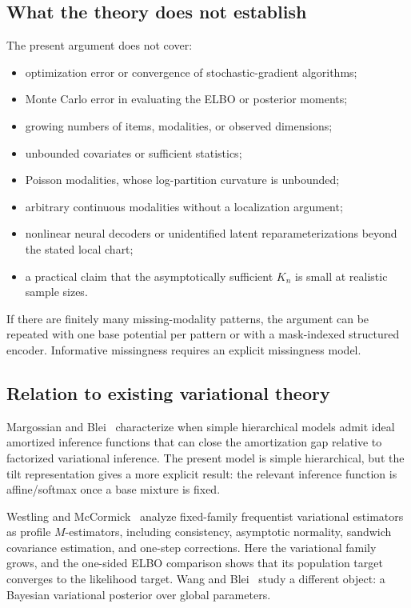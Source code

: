 \documentclass[11pt]{article}
\theoremstyle{definition}
\begin{document}
\subsection{What the theory does not establish}

The present argument does not cover:
\begin{itemize}
\item optimization error or convergence of stochastic-gradient algorithms;
\item Monte Carlo error in evaluating the ELBO or posterior moments;
\item growing numbers of items, modalities, or observed dimensions;
\item unbounded covariates or sufficient statistics;
\item Poisson modalities, whose log-partition curvature is unbounded;
\item arbitrary continuous modalities without a localization argument;
\item nonlinear neural decoders or unidentified latent reparameterizations beyond the stated local chart;
\item a practical claim that the asymptotically sufficient $K_n$ is small at realistic sample sizes.
\end{itemize}

If there are finitely many missing-modality patterns, the argument can be repeated with one base potential per pattern or with a mask-indexed structured encoder. Informative missingness requires an explicit missingness model.

\subsection{Relation to existing variational theory}

Margossian and Blei~\cite{margossianblei2024} characterize when simple hierarchical models admit ideal amortized inference functions that can close the amortization gap relative to factorized variational inference. The present model is simple hierarchical, but the tilt representation gives a more explicit result: the relevant inference function is affine/softmax once a base mixture is fixed.

Westling and McCormick~\cite{westling2019} analyze fixed-family frequentist variational estimators as profile $M$-estimators, including consistency, asymptotic normality, sandwich covariance estimation, and one-step corrections. Here the variational family grows, and the one-sided ELBO comparison shows that its population target converges to the likelihood target. Wang and Blei~\cite{wangblei2019} study a different object: a Bayesian variational posterior over global parameters.
\end{document}
